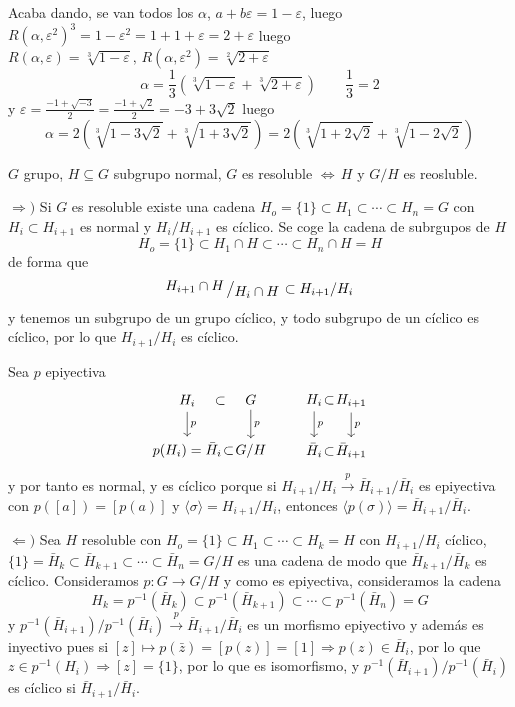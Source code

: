 Acaba dando, se van todos los $\alpha$, $a+b\varepsilon = 1-\varepsilon$, luego $R(\alpha, \varepsilon^2)^3 = 1-\varepsilon^2 = 1+1+\varepsilon = 2+\varepsilon$
luego $R(\alpha, \varepsilon) = \sqrt[3]{1-\varepsilon}, \, R(\alpha, \varepsilon^2) = \sqrt[2]{2+\varepsilon}$
$$\alpha = \frac{1}{3} \left( \sqrt[3]{1-\varepsilon} + \sqrt[3]{2+\varepsilon} \right) \quad \quad \frac{1}{3} = 2$$
y $\varepsilon = \frac{-1+\sqrt{-3}}{2} = \frac{-1+\sqrt{2}}{2} = -3 + 3\sqrt{2}$ luego $$\boxed{\alpha = 2 \left( \sqrt[3]{1-3\sqrt{2}} + \sqrt[3]{1+3\sqrt{2}} \right) = 2 \left( \sqrt[3]{1+2\sqrt{2}} + \sqrt[3]{1-2\sqrt{2}} \right) }$$
\begin{ejer}
    $G$ grupo, $H\subseteq G$ subgrupo normal, $G$ es resoluble $\iff \, H$ y $G/H$ es reosluble. 
\end{ejer}
\begin{dem}
    $\Rightarrow)$ Si $G$ es resoluble existe una cadena $H_o = \{1\} \subset H_1 \subset \cdots \subset H_n = G$ con $H_i \subset H_{i+1}$ es normal y $H_i / H_{i+1}$ es c\'iclico. Se coge la cadena de subrgupos de $H$
    $$H_o = \{1\} \subset H_1 \cap H \subset \cdots \subset H_n \cap H= H$$
     de forma que 
     $$\modulo{H_{i+1} \cap H}{H_i \cap H} \subset H_{i+1}/H_i$$
     y tenemos un subgrupo de un grupo c\'iclico, y todo subgrupo de un c\'iclico es c\'iclico, por lo que $H_{i+1}/H_i$ es c\'iclico. 

        Sea $p$ epiyectiva
     $$\bt H_i \rar[phantom]{\subset} \arrow{d}{p} &[-8mm] G \arrow{d}{p} \\ p(H_i) = \bar H_i \rar[phantom]{\subset} &[-8mm] G/H \et \qquad \bt H_i \rar[phantom]{\subset} \arrow{d}{p} &[-8mm] H_{i+1} \arrow{d}{p} \\ \bar H_i \rar[phantom]{\subset} &[-8mm] \bar H_{i+1} \et$$
     y por tanto es normal, y es c\'iclico porque si $H_{i+1} / H_i \overset{p}{\longrightarrow} \bar H_{i+1} / \bar H_i$ es epiyectiva con $p([a]) = [p(a)]$ y  $\langle \sigma \rangle = H_{i+1} / H_i$, entonces $\langle p(\sigma) \rangle = \bar H_{i+1} / \bar H_i$.

     $\Leftarrow)$ Sea $H$ resoluble con $H_o = \{1\} \subset H_1 \subset \cdots \subset H_k = H$ con $H_{i+1} / H_i$ c\'iclico, $\{1\} = \bar H_k \subset \bar H_{k+1} \subset \cdots \subset \bar H_n = G/H$ es una cadena de modo que $\bar H_{k+1} / \bar H_{k}$ es c\'iclico. Consideramos $p: G \longrightarrow G/H$ y como es epiyectiva, consideramos la cadena 
     $$H_k = p^{-1}(\bar H_k) \subset  p^{-1}(\bar H_{k+1}) \subset \cdots \subset  p^{-1}(\bar H_n) = G$$
     y $ p^{-1}(\bar H_{i+1}) /  p^{-1}(\bar H_i) \overset{p}{\longrightarrow} \bar H_{i+1} / \bar H_i$ es un morfismo epiyectivo y adem\'as es inyectivo pues si $[z] \longmapsto p(\bar z) = [p(z)] =  [1] \Rightarrow p(z) \in \bar H_i$, por lo que $z \in p^{-1}(H_i)\Rightarrow [z]=\{1\}$, por lo que es isomorfismo, y $p^{-1}(\bar H_{i+1}) /  p^{-1}(\bar H_i) $ es c\'iclico si $\bar H_{i+1} / \bar H_i$. 
\end{dem}
